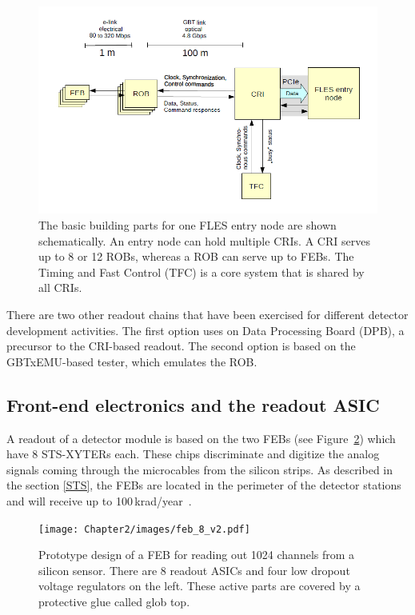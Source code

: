 \begin{figure}[!h]
\centering
\includegraphics[width=0.8\columnwidth]{Chapter2/images/CRI_DAQ.png}
\caption{The basic building parts for one \gls{FLES} entry node are shown schematically. An entry node can hold multiple \glspl{CRI}. A \gls{CRI} serves up to 8 or 12 \glspl{ROB}, whereas a \gls{ROB} can serve up to \glspl{FEB}. The Timing and Fast Control (\gls{TFC}) is a core system that is shared by all \glspl{CRI}.}
\label{fig_daq_schem}
\end{figure}

There are two other readout chains that have been exercised for different detector development activities. The first option uses on Data Processing Board (\gls{DPB}), a precursor
to the CRI-based readout. The second option is based on the GBTxEMU-based tester, which emulates the \gls{ROB}.


\subsection{Front-end electronics and the readout ASIC}

A readout of a detector module is based on the two \glspl{FEB} (see Figure~\ref{fig_feb}) which have 8 STS-XYTERs each. These chips discriminate and digitize the analog signals coming through the microcables from the silicon strips. As described in the section \ref{STS}, the \glspl{FEB} are located in the perimeter of the detector stations and will receive up to 100\,krad/year~\cite{Heuser:54798}.

\begin{figure}[!h]
\centering
\texttt{[image: Chapter2/images/feb\_8\_v2.pdf]}
\caption{Prototype design of a \gls{FEB} for reading out 1024 channels from a silicon sensor. There are 8 readout ASICs and four low dropout voltage regulators on the left. These active parts are covered by a protective glue called glob top.}
\label{fig_feb}
\end{figure}

